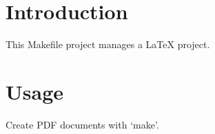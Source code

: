 \documentclass{article}
\begin{document}
\maketitle
\tableofcontents
\section{Introduction}
This Makefile project manages a \LaTeX{} project.
\section{Usage}
Create PDF documents with `make'.

\null
\vfill
{}
\end{document}
